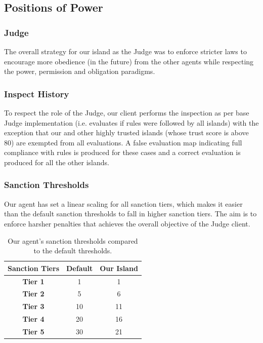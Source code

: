 \documentclass{article}
\begin{document}
\subsection{Positions of Power}

\subsubsection{Judge}

The overall strategy for our island as the Judge was to enforce stricter laws to encourage more obedience (in the future) from the other agents while respecting the power, permission and obligation paradigms. 

\subsubsection*{Inspect History}
To respect the role of the Judge, our client performs the inspection as per base Judge implementation (i.e. evaluates if rules were followed by all islands) with the exception that our and other highly trusted islands (whose trust score is above 80) are exempted from all evaluations. A false evaluation map indicating full compliance with rules is produced for these cases and a correct evaluation is produced for all the other islands. 


\subsubsection*{Sanction Thresholds}
Our agent has set a linear scaling for all sanction tiers, which makes it easier than the default sanction thresholds to fall in higher sanction tiers. The aim is to enforce harsher penalties that achieves the overall objective of the Judge client.

\begin{table}[htb]
    \centering
    \begin{tabular}{|c|c c|}
    \hline
    \textbf{Sanction Tiers}  & \textbf{Default} & \textbf{Our Island} \\ \hline
\textbf{Tier 1} & 1    & 1    \\
\textbf{Tier 2} & 5    & 6  \\
\textbf{Tier 3} & 10   & 11 \\
\textbf{Tier 4} & 20   & 16   \\
\textbf{Tier 5} & 30   & 21  \\
    \hline
\end{tabular}
\caption{Our agent's sanction thresholds compared to the default thresholds.}
\label{table:sanction_thresholds}
\end{table}
\end{document}
